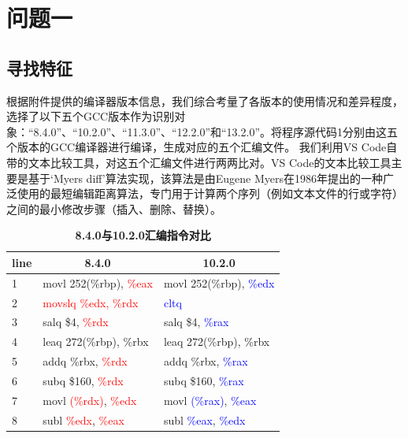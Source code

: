 \section{问题一}
\subsection{寻找特征}
根据附件提供的编译器版本信息，我们综合考量了各版本的使用情况和差异程度，选择了以下五个GCC版本作为识别对象：“8.4.0”、“10.2.0”、“11.3.0”、“12.2.0”和“13.2.0”。将程序源代码1分别由这五个版本的GCC编译器进行编译，生成对应的五个汇编文件。
我们利用VS Code自带的文本比较工具，对这五个汇编文件进行两两比对。VS Code的文本比较工具主要是基于‘Myers diff’算法实现，该算法是由Eugene Myers在1986年提出的一种广泛使用的最短编辑距离算法，专门用于计算两个序列（例如文本文件的行或字符）之间的最小修改步骤（插入、删除、替换）。
\begin{table}[H]
\caption{\textbf{8.4.0与10.2.0汇编指令对比}}%
\label{tab:zhiling}
\centering%
\begin{tabular}{l|l|l}%

\toprule%
\multicolumn{1}{c}{line} & \multicolumn{1}{c}{8.4.0} & \multicolumn{1}{c}{10.2.0} \\
\midrule%
1 &movl	252(\%rbp), \textcolor{red}{\%eax}&movl	252(\%rbp), \textcolor{blue}{\%edx} \\
  2 &\textcolor{red}{movslq	\%edx, \%rdx}&\textcolor{blue}{cltq}\\
3 &salq	\$4, \textcolor{red}{\%rdx}&salq	\$4, \textcolor{blue}{\%rax}\\
4 &leaq	272(\%rbp), \%rbx&leaq	272(\%rbp), \%rbx\\
5 &addq	\%rbx, \textcolor{red}{\%rdx}&addq	\%rbx, \textcolor{blue}{\%rax}\\
6 &subq	\$160, \textcolor{red}{\%rdx}&subq	\$160, \textcolor{blue}{\%rax}\\
7 &movl	\textcolor{red}{(\%rdx)}, \textcolor{red}{\%edx}&movl	\textcolor{blue}{(\%rax)}, \textcolor{blue}{\%eax}\\
8 &subl	\textcolor{red}{\%edx}, \textcolor{red}{\%eax}&subl	\textcolor{blue}{\%eax}, \textcolor{blue}{\%edx} \\
\bottomrule%
\end{tabular}

\end{table}



